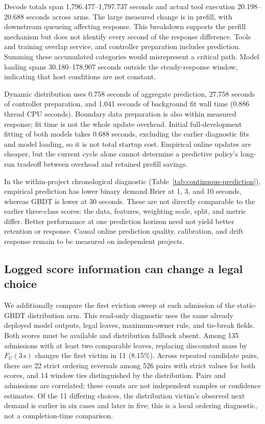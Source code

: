 \documentclass[sigconf, screen, review, balance=false]{acmart}
\begin{document}


Decode totals span 1,796.477--1,797.737 seconds and actual tool execution
20.198--20.688 seconds across arms. The large measured change is in
prefill, with downstream queueing affecting response. This breakdown
supports the prefill mechanism but does not identify every second of
the response difference. Tools and training overlap service, and
controller preparation includes prediction. Summing these accumulated
categories would misrepresent a critical path. Model loading spans
30.180--178.907 seconds outside the steady-response window, indicating
that host conditions are not constant.

Dynamic distribution uses 0.758 seconds of aggregate prediction,
27.758 seconds of controller preparation, and 1.041 seconds of
background fit wall time (0.886 thread CPU seconds). Boundary data
preparation is also within measured response; fit time is not the whole
update overhead. Initial full-development fitting of both models takes
0.688 seconds, excluding the earlier diagnostic fits and model loading,
so it is not total startup cost. Empirical online updates are cheaper,
but the current cycle alone cannot determine a predictive policy's
long-run tradeoff between overhead and retained prefill savings.



In the within-project chronological diagnostic
(Table~\ref{tab:continuous-prediction}), empirical prediction has lower
binary demand Brier at 1, 3, and 10 seconds, whereas GBDT is lower at
30 seconds. These are not directly comparable to the earlier
three-class scores: the data, features, weighting scale, split, and
metric differ. Better performance at one prediction horizon need not
yield better retention or response. Causal online prediction quality,
calibration, and drift response remain to be measured on independent
projects.


\subsection{Logged score information can change a legal choice}
\label{score-disagreement}

We additionally compare the first eviction sweep at each admission of
the static-GBDT distribution arm. This read-only diagnostic uses the
same already deployed model outputs, legal leaves, maximum-owner rule,
and tie-break fields. Both scores must be available and distribution
fallback absent. Among 135 admissions with at least two comparable
leaves, replacing discounted mass by \(F_U(3\,\mathrm{s})\) changes the
first victim in 11 (8.15\%). Across repeated candidate pairs, there
are 22 strict ordering reversals among 526 pairs with strict values for
both scores, and 14 window ties distinguished by the distribution.
Pairs and admissions are correlated; these counts are not independent
samples or confidence estimates.
Of the 11 differing choices, the distribution victim's observed next
demand is earlier in six cases and later in five; this is a local
ordering diagnostic, not a completion-time comparison.
\end{document}
